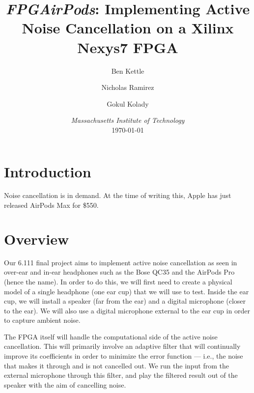 \documentclass{fpgairpods}
\begin{document}
\title{\textit{FPGAirPods}: Implementing Active Noise Cancellation on a Xilinx Nexys7 FPGA}
\date{\textit{Massachusetts Institute of Technology} \\ \today}
\author{Ben Kettle \\  
\and Nicholas Ramirez \\  \and Gokul Kolady \\ }

\maketitle
\tableofcontents

\newpage
\begin{multicols}{2}
\section{Introduction}

	Noise cancellation is in demand. At the time of writing this, Apple has just released AirPods Max for \$550.

\section{Overview}
Our 6.111 final project aims to implement active noise cancellation as seen in over-ear and in-ear headphones such as the Bose QC35 and the AirPods Pro (hence the name). In order to do this, we will first need to create a physical model of a single headphone (one ear cup) that we will use to test. Inside the ear cup, we will install a speaker (far from the ear) and a digital microphone (closer to the ear). We will also use a digital microphone external to the ear cup in order to capture ambient noise.

The FPGA itself will handle the computational side of the active noise cancellation. This will primarily involve an adaptive filter that will continually improve its coefficients in order to minimize the error function --- i.e., the noise that makes it through and is not cancelled out. We run the input from the external microphone through this filter, and play the filtered result out of the speaker with the aim of cancelling noise.


\end{multicols}
\end{document}
